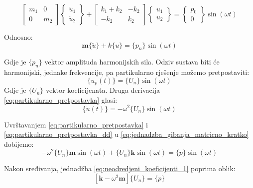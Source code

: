 \documentclass{rgn}
\newcommand\mm{\mathbf{m}}
\newcommand\kk{\mathbf{k}}
\begin{document}
\begin{equation}\label{eq:jednadzba_gibanja_matricno}
    \begin{bmatrix}
        m_1 & 0 \\
        0   & m_2
    \end{bmatrix}
    \begin{Bmatrix}
        \ddot{u}_1\\
        \ddot{u}_2
    \end{Bmatrix}
    +
    \begin{bmatrix}
        k_1+k_2 & -k_2\\
        -k_2 & k_2
    \end{bmatrix}
    \begin{Bmatrix}
        u_1\\
        u_2
    \end{Bmatrix}
    =
    \begin{Bmatrix}
        p_0\\
        0 
    \end{Bmatrix}
    \sin(\omega t)
\end{equation}

Odnosno:
\begin{equation}\label{eq:jednadzba_gibanja_matricno_kratko}
    \mm\{\ddot{u}\}+k\{u\}=\{p_n\}\sin(\omega t)
\end{equation}

Gdje je $\{p_n\}$ vektor amplituda harmonijskih sila. Odziv sustava biti će
harmonijski, jednake frekvencije, pa partikularno rješenje možemo pretpostaviti:
\begin{equation}\label{eq:partikularno_pretpostavka}
    \{u_p(t)\}{}=\{U_n\}{}\sin(\omega t)
\end{equation}
Gdje je $\{U_n\}$ vektor koeficijenata.
Druga derivacija \eqref{eq:partikularno_pretpostavka} glasi:
\begin{equation}\label{eq:partikularno_pretpostavka_dd}
    \{\ddot{u}(t)\}=-\omega^2\{U_n\}\sin(\omega t)
\end{equation}

Uvrštavanjem \eqref{eq:partikularno_pretpostavka} i \eqref{eq:partikularno_pretpostavka_dd}
u \eqref{eq:jednadzba_gibanja_matricno_kratko} dobijemo:
\begin{equation}\label{eq:neodredjeni_koeficijenti_1}
    -\omega^2\{U_n\}\mm\sin(\omega t) 
    +
    \{U_n\}\kk\sin(\omega t)
    =
    \{p\}\sin(\omega t)
\end{equation}

Nakon sređivanja, jednadžba \eqref{eq:neodredjeni_koeficijenti_1} poprima oblik:
\begin{equation}\label{eq:neodredjeni_koeficijenti_2}
    [\kk-\omega^2\mm]\{U_n\}=\{p\}
\end{equation}
\end{document}
